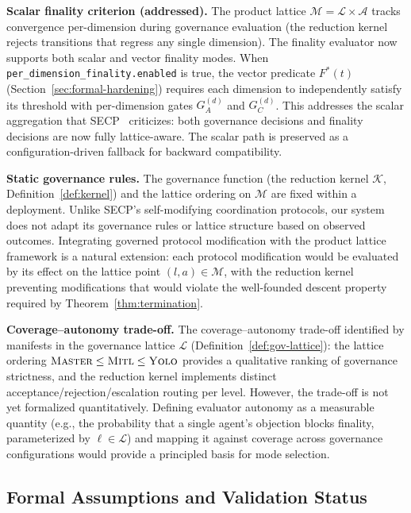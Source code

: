\documentclass[11pt]{article}
\begin{document}
\textbf{Scalar finality criterion (addressed).} The product lattice $\mathcal{M} = \mathcal{L} \times \mathcal{A}$ tracks convergence per-dimension during governance evaluation (the reduction kernel rejects transitions that regress any single dimension). The finality evaluator now supports both scalar and vector finality modes. When \texttt{per\_dimension\_finality.enabled} is true, the vector predicate $F^*(t)$ (Section~\ref{sec:formal-hardening}) requires each dimension to independently satisfy its threshold with per-dimension gates $G_A^{(d)}$ and $G_C^{(d)}$. This addresses the scalar aggregation that SECP~\cite{delachica2026} criticizes: both governance decisions and finality decisions are now fully lattice-aware. The scalar path is preserved as a configuration-driven fallback for backward compatibility.

\textbf{Static governance rules.} The governance function (the reduction kernel $\mathcal{K}$, Definition~\ref{def:kernel}) and the lattice ordering on $\mathcal{M}$ are fixed within a deployment. Unlike SECP's self-modifying coordination protocols, our system does not adapt its governance rules or lattice structure based on observed outcomes. Integrating governed protocol modification \cite{delachica2026} with the product lattice framework is a natural extension: each protocol modification would be evaluated by its effect on the lattice point $(l, a) \in \mathcal{M}$, with the reduction kernel preventing modifications that would violate the well-founded descent property required by Theorem~\ref{thm:termination}.

\textbf{Coverage--autonomy trade-off.} The coverage--autonomy trade-off identified by \cite{delachica2026} manifests in the governance lattice $\mathcal{L}$ (Definition~\ref{def:gov-lattice}): the lattice ordering $\textsc{Master} \leq \textsc{Mitl} \leq \textsc{Yolo}$ provides a qualitative ranking of governance strictness, and the reduction kernel implements distinct acceptance/rejection/escalation routing per level. However, the trade-off is not yet formalized quantitatively. Defining evaluator autonomy as a measurable quantity (e.g., the probability that a single agent's objection blocks finality, parameterized by $\ell \in \mathcal{L}$) and mapping it against coverage across governance configurations would provide a principled basis for mode selection.

\subsection{Formal Assumptions and Validation Status}
\end{document}
